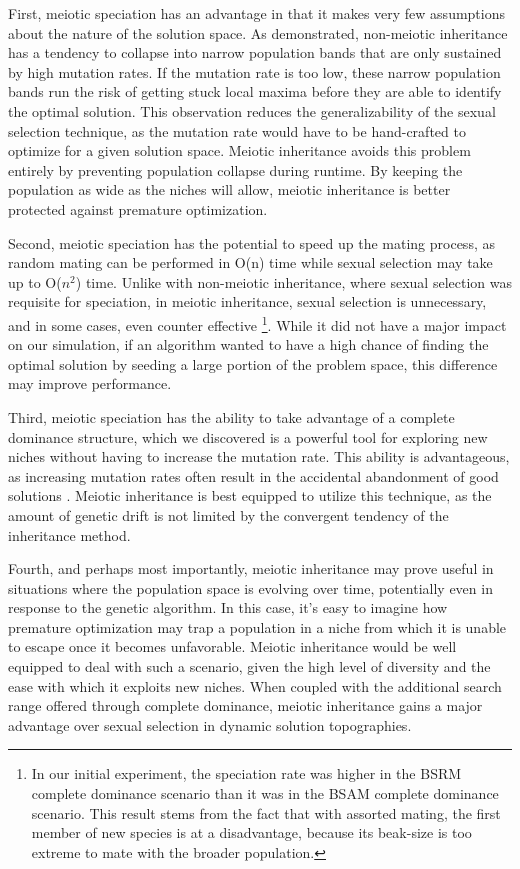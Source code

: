 \documentclass[conference]{IEEEtran}
\begin{document}
First, meiotic speciation has an advantage in that it makes very few assumptions about the nature of the solution space. As demonstrated, non-meiotic inheritance has a tendency to collapse into narrow population bands that are only sustained by high mutation rates. If the mutation rate is too low, these narrow population bands run the risk of getting stuck local maxima before they are able to identify the optimal solution. This observation reduces the generalizability of the sexual selection technique, as the mutation rate would have to be hand-crafted to optimize for a given solution space. Meiotic inheritance avoids this problem entirely by preventing population collapse during runtime. By keeping the population as wide as the niches will allow, meiotic inheritance is better protected against premature optimization.

Second, meiotic speciation has the potential to speed up the mating process, as random mating can be performed in O(n) time while sexual selection may take up to O($n^2$) time. Unlike with non-meiotic inheritance, where sexual selection was requisite for speciation, in meiotic inheritance, sexual selection is unnecessary, and in some cases, even counter effective \footnote{In our initial experiment, the speciation rate was higher in the BSRM complete dominance scenario than it was in the BSAM complete dominance scenario. This result stems from the fact that with assorted mating, the first member of new species is at a disadvantage, because its beak-size is too extreme to mate with the broader population.}. While it did not have a major impact on our simulation, if an algorithm wanted to have a high chance of finding the optimal solution by seeding a large portion of the problem space, this difference may improve performance. 

Third, meiotic speciation has the ability to take advantage of a complete dominance structure, which we discovered is a powerful tool for exploring new niches without having to increase the mutation rate. This ability is advantageous, as increasing mutation rates often result in the accidental abandonment of good solutions \cite{TAGGING}. Meiotic inheritance is best equipped to utilize this technique, as the amount of genetic drift is not limited by the convergent tendency of the inheritance method.

Fourth, and perhaps most importantly, meiotic inheritance may prove useful in situations where the population space is evolving over time, potentially even in response to the genetic algorithm. In this case, it's easy to imagine how premature optimization may trap a population in a niche from which it is unable to escape once it becomes unfavorable. Meiotic inheritance would be well equipped to deal with such a scenario, given the high level of diversity and the ease with which it exploits new niches. When coupled with the additional search range offered through complete dominance, meiotic inheritance gains a major advantage over sexual selection in dynamic solution topographies. 
\end{document}
